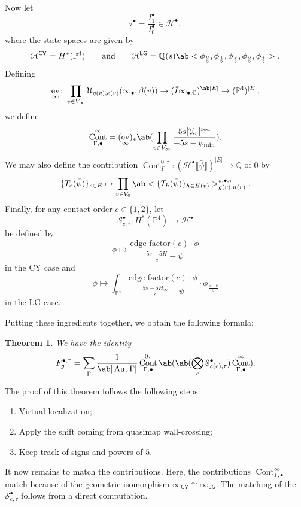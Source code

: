\documentclass[10pt]{amsart}
\newtheorem{thm}{Theorem}[section]
\theoremstyle{definition}
\theoremstyle{remark}
\theoremstyle{plain}
\theoremstyle{definition}
\theoremstyle{remark}
\newcommand{\C}{\mathbb{C}}
\newcommand{\Q}{\mathbb{Q}}
\renewcommand{\P}{\mathbb{P}}
\newcommand{\mc}[1]{\mathcal{#1}}
\newcommand{\mr}[1]{\mathrm{#1}}
\newcommand{\ms}[1]{\mathsf{#1}}
\newcommand{\1}{\mathbf{1}}
\newcommand{\2}{\mathbf{2}}
\newcommand{\3}{\mathbf{3}}
\newcommand{\red}{\mr{red}}
\newcommand{\ps}[1]{\llbracket #1 \rrbracket}
\newcommand{\LG}{\ms{LG}}
\newcommand{\CY}{\ms{CY}}
\DeclareMathOperator{\Aut}{Aut}
\DeclareMathOperator{\ev}{ev}
\DeclareMathOperator{\Cont}{Cont}
\begin{document}
Now let
\[ \tau^{\bullet} = \frac{I_1^{\bullet}}{I_0^{\bullet}} \in \mc{H}^{\bullet}, \]
where the state spaces are given by
\[ \mc{H}^{\CY} = H^*(\P^4) \qquad \text{and} \qquad \mc{H}^{\LG} = \Q(s) \ab<\phi_{\frac{0}{5}},\phi_{\frac{1}{5}},\phi_{\frac{2}{5}},\phi_{ \frac{3}{5} },\phi_{\frac{4}{5}}>. \]
Defining
\[ \ev_{\infty} \colon \prod_{v \in V_{\infty}} \mc{U}_{g(v), e(v)}(\infty_{\bullet}, \beta(v)) \to (\bar{I}\infty_{\bullet,\C})^{\ab|E|} \to (\P^4)^{|E|}, \]
we define
\[ \Cont_{\Gamma,\bullet}^{\infty} = ( \ev_{\infty} )_* \ab(\prod_{v \in V_{\infty}} \frac{5s[\mc{U}_v]^{\red}}{-5s-\psi_{\min}}). \]
We may also define the contribution $\Cont_{\Gamma}^{0,\tau} \colon (\mc{H}^{\bullet}\ps{\bar{\psi}})^{|E|} \to \Q$ of $0$ by
\[ \{T_e(\bar{\psi})\}_{e \in E} \mapsto \prod_{v \in V_0} \ab<\{T_h(\bar{\psi})\}_{h \in H(v)}>^{s,\bullet,\tau}_{g(v), n(v)}. \]
Finally, for any contact order $c \in \{1,2\}$, let
\[ \mc{S}_{c,\tau}^{\bullet} \colon H^*(\P^4) \to \mc{H}^{\bullet} \]
be defined by
\[ \phi \mapsto \frac{\text{edge factor}(c)\cdot \phi}{\frac{ 5s-5H }{c}-\psi} \]
in the CY case and
\[ \phi \mapsto \int_{\P^4} \frac{\text{edge factor}(c) \cdot \phi}{\frac{ 5s-5H_{\infty} }{c}-\psi} \cdot \phi_{\frac{5-c}{5}} \]
in the LG case.

Putting these ingredients together, we obtain the following formula:
\begin{thm}
    We have the identity
    \begin{align*}
        F_g^{\bullet,\tau} = \sum_{\Gamma} \frac{1}{\ab|\Aut \Gamma|} \Cont_{\Gamma,\bullet}^{0\tau} \ab(\ab(\bigotimes_e \mc{S}_{c(e),\tau}^{\bullet}) \Cont_{\Gamma,\bullet}^{\infty}).
    \end{align*}
\end{thm}

The proof of this theorem follows the following steps:
\begin{enumerate}
    \item Virtual localization;
    \item Apply the shift coming from quasimap wall-crossing;
    \item Keep track of signs and powers of $5$.
\end{enumerate}

It now remains to match the contributions. Here, the contributions $\Cont_{\Gamma,\bullet}^{\infty}$ match because of the geometric isomorphism $\infty_{\CY} \cong \infty_{\LG}$. The matching of the $\mc{S}_{c,\tau}^{\bullet}$ follows from a direct computation.
\end{document}

